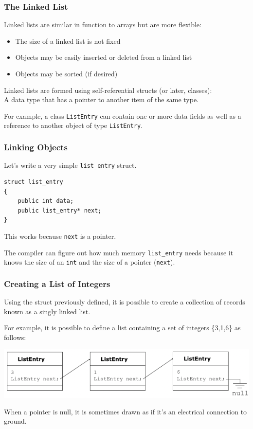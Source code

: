 \begin{frame}
\frametitle{The Linked List}

Linked lists are similar in function to arrays but are more flexible:
\begin{itemize}
    \item The size of a linked list is not fixed
    \item Objects may be easily inserted or deleted from a linked list
    \item Objects may be sorted (if desired)
\end{itemize}

Linked lists are formed using self-referential structs (or later, classes):\\
\quad A data type that has a pointer to another item of the same type.

For example, a class \texttt{ListEntry} can contain one or more data fields as well as a reference to another object of type \texttt{ListEntry}.

\end{frame}


\begin{frame}[fragile]
\frametitle{Linking Objects}

Let's write a very simple \texttt{list\_entry} struct.

\begin{verbatim}
struct list_entry
{
    public int data;
    public list_entry* next;
}
\end{verbatim}

This works because \texttt{next} is a pointer.

The compiler can figure out how much memory \texttt{list\_entry} needs because it knows the size of an \texttt{int} and the size of a pointer (\texttt{next}).

\end{frame}

\begin{frame}
\frametitle{Creating a List of Integers}

Using the struct previously defined, it is possible to create a collection of records known as a singly linked list.

For example, it is possible to define a list containing a set of integers \{3,1,6\} as follows:

\begin{center}
    \includegraphics[width=\textwidth]{images/list316.png}
\end{center}

When a pointer is null, it is sometimes drawn as if it's an electrical connection to ground.

\end{frame}

